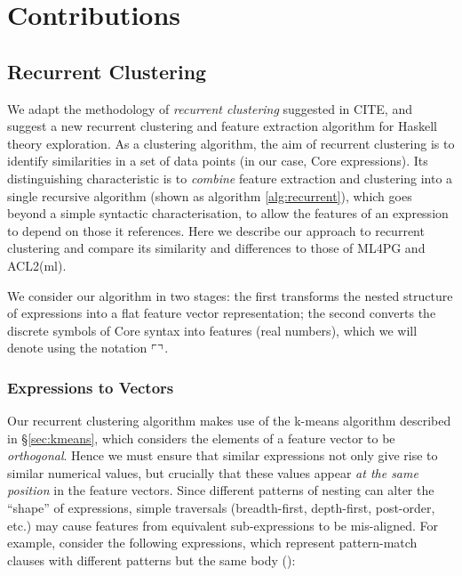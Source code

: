 \section{Contributions}
\label{sec:contributions}

\subsection{Recurrent Clustering}
\label{sec:recurrentclustering}

\iffalse TODO: Focus the section more on the problem of identifiers, and how recurrent clustering uses clustering as part of feature extraction to solve this \fi

We adapt the methodology of \emph{recurrent clustering} suggested in CITE, and suggest a new recurrent clustering and feature extraction algorithm for Haskell \iffalse TODO: Fix the end of this sentence \fi theory exploration. As a clustering algorithm, the aim of recurrent clustering is to identify similarities in a set of data points (in our case, Core expressions). Its distinguishing characteristic is to \emph{combine} feature extraction and clustering into a single recursive algorithm (shown as algorithm \ref{alg:recurrent}), which goes beyond a simple syntactic characterisation, to allow the features of an expression to depend on those it references. Here we describe our approach to recurrent clustering and compare its similarity and differences to those of ML4PG and ACL2(ml).

We consider our algorithm in two stages: the first transforms the nested structure of expressions into a flat feature vector representation; the second converts the discrete symbols of Core syntax into features (real numbers), which we will denote using the notation $\left\ulcorner  \right\urcorner$.

\subsubsection{Expressions to Vectors}

Our recurrent clustering algorithm makes use of the k-means algorithm described in \S \ref{sec:kmeans}, which considers the elements of a feature vector to be \emph{orthogonal}. Hence we must ensure that similar expressions not only give rise to similar numerical values, but crucially that these values appear \emph{at the same position} in the feature vectors. Since different patterns of nesting can alter the ``shape'' of expressions, simple traversals (breadth-first, depth-first, post-order, etc.) may cause features from equivalent sub-expressions to be mis-aligned. For example, consider the following expressions, which represent pattern-match clauses with different patterns but the same body ():

